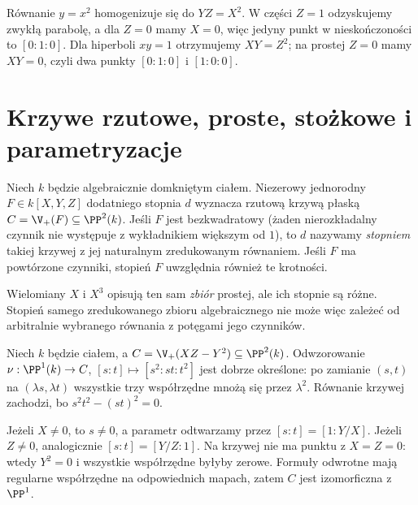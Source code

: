 \begin{przyklad}
Równanie $y=x^2$ homogenizuje się do $YZ=X^2$.
W części $Z=1$ odzyskujemy zwykłą parabolę, a dla $Z=0$
mamy $X=0$, więc jedyny punkt w nieskończoności to $[0:1:0]$.
Dla hiperboli $xy=1$ otrzymujemy $XY=Z^2$;
na prostej $Z=0$ mamy $XY=0$, czyli dwa punkty
$[0:1:0]$ i $[1:0:0]$.
\end{przyklad}

\section{Krzywe rzutowe, proste, stożkowe i parametryzacje}

\begin{definicja}
Niech $k$ będzie algebraicznie domkniętym ciałem.
Niezerowy jednorodny $F\in k[X,Y,Z]$ dodatniego stopnia $d$
wyznacza rzutową krzywą płaską $C=\V_+(F)\subseteq\PP^2(k)$.
Jeśli $F$ jest bezkwadratowy (żaden nierozkładalny czynnik
nie występuje z wykładnikiem większym od $1$), to $d$
nazywamy \emph{stopniem} takiej krzywej z jej naturalnym
zredukowanym równaniem. Jeśli $F$ ma powtórzone czynniki,
stopień $F$ uwzględnia również te krotności.
\end{definicja}

\begin{uwaga}
Wielomiany $X$ i $X^3$ opisują ten sam \emph{zbiór} prostej,
ale ich stopnie są różne. Stopień samego zredukowanego
zbioru algebraicznego nie może więc zależeć od arbitralnie
wybranego równania z potęgami jego czynników.
\end{uwaga}

\begin{przyklad}
Niech $k$ będzie ciałem, a $C=\V_+(XZ-Y^2)\subseteq\PP^2(k)$.
Odwzorowanie
$\nu:\PP^1(k)\to C$, $[s:t]\mapsto[s^2:st:t^2]$
jest dobrze określone: po zamianie $(s,t)$ na
$(\lambda s,\lambda t)$ wszystkie trzy współrzędne
mnożą się przez $\lambda^2$. Równanie krzywej zachodzi,
bo $s^2t^2-(st)^2=0$.

Jeżeli $X\ne0$, to $s\ne0$, a parametr odtwarzamy przez
$[s:t]=[1:Y/X]$. Jeżeli $Z\ne0$, analogicznie
$[s:t]=[Y/Z:1]$. Na krzywej nie ma punktu z $X=Z=0$:
wtedy $Y^2=0$ i wszystkie współrzędne byłyby zerowe.
Formuły odwrotne mają regularne współrzędne na odpowiednich
mapach, zatem $C$ jest izomorficzna z $\PP^1$.
\end{przyklad}

